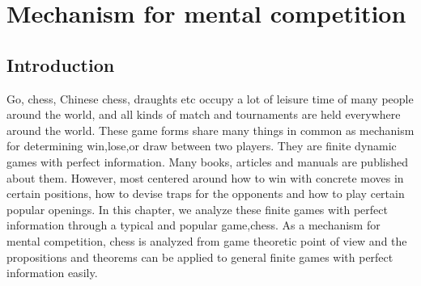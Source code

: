 
\chapter{ Mechanism for mental competition }  %

\label{Chapter5} %



\section{Introduction}
 Go, chess, Chinese chess, draughts etc occupy a lot of leisure time of many people around the world, and all kinds of match and tournaments are held everywhere around the world. 
 These game forms share many things in common as mechanism for determining win,lose,or draw between two players. They are finite dynamic games with perfect information.
 Many books, articles and manuals are published about them. However, most centered around how to win with concrete moves in certain positions, how to devise traps for the opponents and how to 
 play certain popular openings.  In this chapter, we analyze these finite games with perfect information through a typical and popular game,chess. 
 As a mechanism for mental competition, chess is analyzed from game theoretic point of view and the propositions and theorems can be applied to general finite games with perfect information easily.

